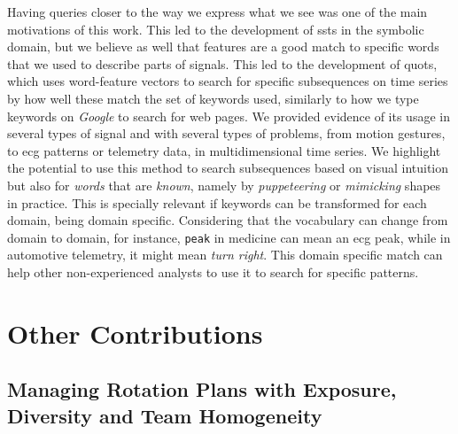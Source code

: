 \par
Having queries closer to the way we express what we see was one of the main motivations of this work. This led to the development of \gls{ssts} in the symbolic domain, but we believe as well that features are a good match to specific words that we used to describe parts of signals. This led to the development of \gls{quots}, which uses word-feature vectors to search for specific subsequences on time series by how well these match the set of keywords used, similarly to how we type keywords on \textit{Google} to search for web pages. We provided evidence of its usage in several types of signal and with several types of problems, from motion gestures, to \gls{ecg} patterns or telemetry data, in multidimensional time series. We highlight the potential to use this method to search subsequences based on visual intuition but also for \textit{words} that are \textit{known}, namely by \textit{puppeteering} or \textit{mimicking} shapes in practice. This is specially relevant if keywords can be transformed for each domain, being domain specific. Considering that the vocabulary can change from domain to domain, for instance, \texttt{peak} in medicine can mean an \gls{ecg} peak, while in automotive telemetry, it might mean \textit{turn right}. This domain specific match can help other non-experienced analysts to use it to search for specific patterns.

\section{Other Contributions}

\subsection{Managing Rotation Plans with Exposure, Diversity and Team Homogeneity}

